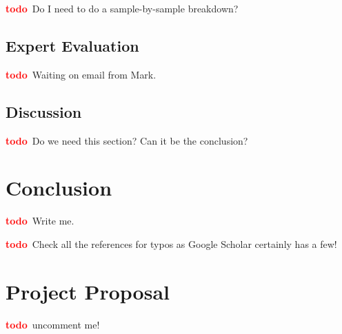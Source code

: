\documentclass[12pt,a4paper,twoside,openright]{report}
\newcommand{\todo}{\textcolor{red}{\textbf{todo}~}}
\begin{document}
\todo Do I need to do a sample-by-sample breakdown?

\section{Expert Evaluation}

\todo Waiting on email from Mark.

\section{Discussion}

\todo Do we need this section? Can it be the conclusion?

\chapter{Conclusion}

\todo Write me.

\printbibliography
{}
\todo Check all the references for typos as Google Scholar certainly has a few!

\appendix

\chapter{Project Proposal}

\todo uncomment me!
%
\end{document}
